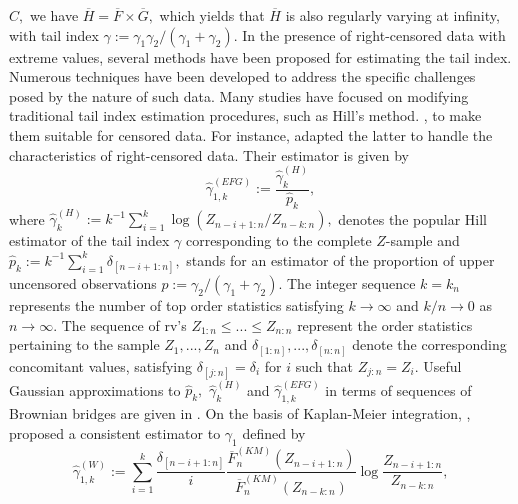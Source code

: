 \documentclass[reqno,openbib,runningheads,a4paper,12pt]{amsart}%
\begin{document}
$C,$ we have $\overline{H}=\overline{F}\times\overline{G},$ which yields that
$\overline{H}$ is also regularly varying at infinity, with tail index
$\gamma:=\gamma_{1}\gamma_{2}/\left(  \gamma_{1}+\gamma_{2}\right)  .$ In the
presence of right-censored data with extreme values, several methods have been
proposed for estimating the tail index. Numerous techniques have been
developed to address the specific challenges posed by the nature of such data.
Many studies have focused on modifying traditional tail index estimation
procedures, such as Hill's method. \citep[][]{Hill75}, to make them suitable
for censored data. For instance, \cite{EnFG08} adapted the latter to handle
the characteristics of right-censored data. Their estimator is given by%
\[
\widehat{\gamma}_{1,k}^{\left(  EFG\right)  }:=\frac{\widehat{\gamma}%
_{k}^{\left(  H\right)  }}{\widehat{p}_{k}},
\]
where $\widehat{\gamma}_{k}^{\left(  H\right)  }:=k^{-1}%
{\displaystyle\sum\limits_{i=1}^{k}}
\log\left(  Z_{n-i+1:n}/Z_{n-k:n}\right)  ,$ denotes the popular Hill
estimator of the tail index $\gamma$ corresponding to the complete $Z$-sample
and $\widehat{p}_{k}:=k^{-1}%
{\displaystyle\sum_{i=1}^{k}}
\delta_{\left[  n-i+1:n\right]  },$ stands for an estimator of the proportion
of upper uncensored observations $p:=\gamma_{2}/\left(  \gamma_{1}+\gamma
_{2}\right)  .$ The integer sequence $k=k_{n}$ represents the number of top
order statistics satisfying $k\rightarrow\infty$ and $k/n\rightarrow0$ as
$n\rightarrow\infty.$ The sequence of rv's $Z_{1:n}\leq...\leq Z_{n:n}$
represent the order statistics pertaining to the sample $Z_{1},...,Z_{n}$ and
$\delta_{\left[  1:n\right]  },...,\delta_{\left[  n:n\right]  }$ denote the
corresponding concomitant values, satisfying $\delta_{\left[  j:n\right]
}=\delta_{i}$ for $i$ such that $Z_{j:n}=Z_{i}.$ Useful Gaussian
approximations to $\widehat{p}_{k},$ $\widehat{\gamma}_{k}^{\left(  H\right)
}$ and $\widehat{\gamma}_{1,k}^{\left(  EFG\right)  }$ in terms of sequences
of Brownian bridges are given in \cite{BMN-2015}. On the basis of Kaplan-Meier
integration, \cite{WW2014}, proposed a consistent estimator to $\gamma_{1}$
defined by%
\[
\widehat{\gamma}_{1,k}^{\left(  W\right)  }:=%
{\displaystyle\sum\limits_{i=1}^{k}}
\frac{\delta_{\left[  n-i+1:n\right]  }}{i}\frac{\overline{F}_{n}^{\left(
KM\right)  }\left(  Z_{n-i+1:n}\right)  }{\overline{F}_{n}^{\left(  KM\right)
}\left(  Z_{n-k:n}\right)  }\log\frac{Z_{n-i+1:n}}{Z_{n-k:n}},
\]
\end{document}
